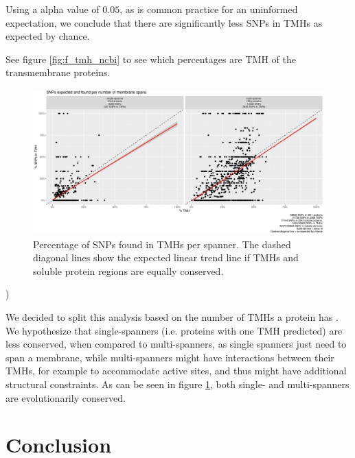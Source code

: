 Using a alpha value of $0.05$, as is common practice for an uninformed
expectation, we conclude that there are significantly less SNPs
in TMHs as expected by chance.

See figure \ref{fig:f_tmh_ncbi} to see which percentages
are TMH of the transmembrane proteins.

\begin{figure}[!htbp]
  \includegraphics[width=\textwidth]{ncbi_peregrine_results/fig_f_snps_found_and_expected_per_spanner.png}
  \caption{
    Percentage of SNPs found in TMHs per spanner.
    The dashed diagonal lines show the expected linear trend line
    if TMHs and soluble protein regions are equally conserved.
  }
  \label{fig:f_snps_found_and_expected_per_spanner}
\end{figure}
)

We decided to split this analysis based on the number of TMHs
a protein has . We hypothesize that single-spanners (i.e. proteins
with one TMH predicted) are less conserved, when compared to multi-spanners,
as single spanners just need to span a membrane, while multi-spanners
might have interactions between their TMHs, 
for example to accommodate active sites, and 
thus might have additional structural constraints.
As can be seen in figure \ref{fig:f_snps_found_and_expected_per_spanner}, 
both single- and multi-spanners are evolutionarily conserved.

\section{Conclusion}

